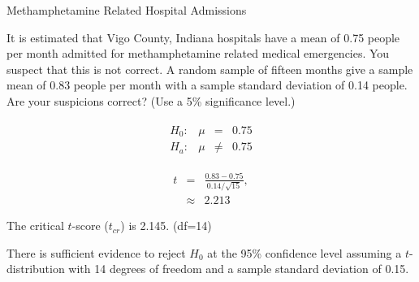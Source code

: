 \begin{frame}{Methamphetamine Related Hospital Admissions}

  It is estimated that Vigo County, Indiana hospitals have a mean of
  0.75 people per month admitted for methamphetamine related medical
  emergencies. You suspect that this is not correct. A random sample
  of fifteen months give a sample mean of 0.83 people per month with a
  {\color{red}sample standard deviation} of 0.14 people. Are your
  suspicions correct?  (Use a 5\% significance level.)

  {
    \begin{eqnarray*}
      \begin{array}{lrcl}
        H_0: & \mu & = & 0.75 \\
        H_a: & \mu & \neq & 0.75
      \end{array}
    \end{eqnarray*}
  }

  {
    \begin{eqnarray*}
      t & = & \frac{0.83-0.75}{0.14/\sqrt{15}}, \\
      & \approx & 2.213
    \end{eqnarray*}
  }

  {
    The critical $t$-score ($t_{cr}$) is 2.145. (df=14)
  }

  {

    {\color{red}
      There is sufficient evidence to reject $H_0$ at the 95\%
      confidence level assuming a $t$-distribution with 14 degrees of
      freedom and a {\color{red}sample standard deviation} of 0.15.
    }

  }

  
\end{frame}




